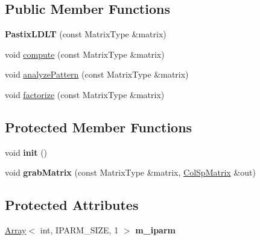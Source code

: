 \subsection*{Public Member Functions}
\begin{DoxyCompactItemize}
\item 
\mbox{\label{class_eigen_1_1_pastix_l_d_l_t_a80904e8c41154d6c0807765436b21e62}} 
{\bfseries Pastix\+L\+D\+LT} (const Matrix\+Type \&matrix)
\item 
void \mbox{\hyperlink{class_eigen_1_1_pastix_l_d_l_t_abf3135c2dc17d9df26fef80e6456a691}{compute}} (const Matrix\+Type \&matrix)
\item 
void \mbox{\hyperlink{class_eigen_1_1_pastix_l_d_l_t_a01947862303ca404b9ce5033751a221b}{analyze\+Pattern}} (const Matrix\+Type \&matrix)
\item 
void \mbox{\hyperlink{class_eigen_1_1_pastix_l_d_l_t_a182b0ee676a131413363cc73bc309ef7}{factorize}} (const Matrix\+Type \&matrix)
\end{DoxyCompactItemize}
\subsection*{Protected Member Functions}
\begin{DoxyCompactItemize}
\item 
\mbox{\label{class_eigen_1_1_pastix_l_d_l_t_adb8dab54456c5c7c851a4df86be44009}} 
void {\bfseries init} ()
\item 
\mbox{\label{class_eigen_1_1_pastix_l_d_l_t_a5999da01d22c5c2db69d8ab7858b8cd0}} 
void {\bfseries grab\+Matrix} (const Matrix\+Type \&matrix, \mbox{\hyperlink{class_eigen_1_1_sparse_matrix}{Col\+Sp\+Matrix}} \&out)
\end{DoxyCompactItemize}
\subsection*{Protected Attributes}
\begin{DoxyCompactItemize}
\item 
\mbox{\label{class_eigen_1_1_pastix_l_d_l_t_a5cdb7299e33d7f089d9e38f191aed9b9}} 
\mbox{\hyperlink{class_eigen_1_1_array}{Array}}$<$ int, I\+P\+A\+R\+M\+\_\+\+S\+I\+ZE, 1 $>$ {\bfseries m\+\_\+iparm}
\end{DoxyCompactItemize}
